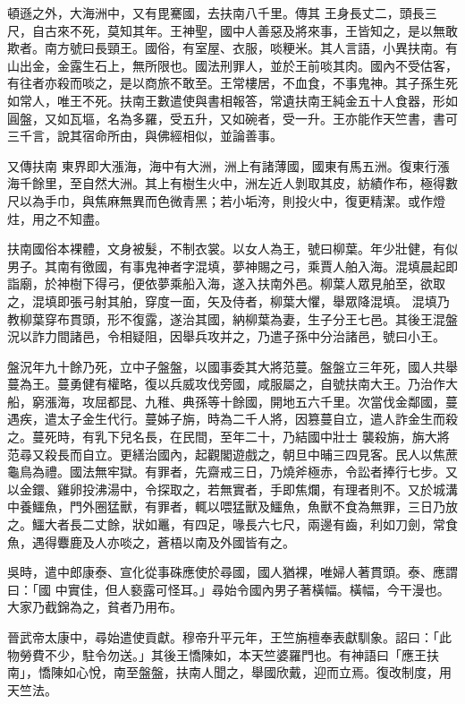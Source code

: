 \begin{pinyinscope}
 頓遜之外，大海洲中，又有毘騫國，去扶南八千里。傳其
 王身長丈二，頭長三尺，自古來不死，莫知其年。王神聖，國中人善惡及將來事，王皆知之，是以無敢欺者。南方號曰長頸王。國俗，有室屋、衣服，啖粳米。其人言語，小異扶南。有山出金，金露生石上，無所限也。國法刑罪人，並於王前啖其肉。國內不受估客，有往者亦殺而啖之，是以商旅不敢至。王常樓居，不血食，不事鬼神。其子孫生死如常人，唯王不死。扶南王數遣使與書相報答，常遺扶南王純金五十人食器，形如圓盤，又如瓦塸，名為多羅，受五升，又如碗者，受一升。王亦能作天竺書，書可三千言，說其宿命所由，與佛經相似，並論善事。



 又傳扶南
 東界即大漲海，海中有大洲，洲上有諸薄國，國東有馬五洲。復東行漲海千餘里，至自然大洲。其上有樹生火中，洲左近人剝取其皮，紡績作布，極得數尺以為手巾，與焦麻無異而色微青黑；若小垢洿，則投火中，復更精潔。或作燈炷，用之不知盡。



 扶南國俗本裸體，文身被髮，不制衣裳。以女人為王，號曰柳葉。年少壯健，有似男子。其南有徼國，有事鬼神者字混填，夢神賜之弓，乘賈人舶入海。混填晨起即詣廟，於神樹下得弓，便依夢乘船入海，遂入扶南外邑。柳葉人眾見舶至，欲取之，混填即張弓射其舶，穿度一面，矢及侍者，柳葉大懼，舉眾降混填。
 混填乃教柳葉穿布貫頭，形不復露，遂治其國，納柳葉為妻，生子分王七邑。其後王混盤況以詐力間諸邑，令相疑阻，因舉兵攻并之，乃遣子孫中分治諸邑，號曰小王。



 盤況年九十餘乃死，立中子盤盤，以國事委其大將范蔓。盤盤立三年死，國人共舉蔓為王。蔓勇健有權略，復以兵威攻伐旁國，咸服屬之，自號扶南大王。乃治作大船，窮漲海，攻屈都昆、九稚、典孫等十餘國，開地五六千里。次當伐金鄰國，蔓遇疾，遣太子金生代行。蔓姊子旃，時為二千人將，因篡蔓自立，遣人詐金生而殺之。蔓死時，有乳下兒名長，在民間，至年二十，乃結國中壯士
 襲殺旃，旃大將范尋又殺長而自立。更繕治國內，起觀閣遊戲之，朝旦中晡三四見客。民人以焦蔗龜鳥為禮。國法無牢獄。有罪者，先齋戒三日，乃燒斧極赤，令訟者捧行七步。又以金鐶、雞卵投沸湯中，令探取之，若無實者，手即焦爛，有理者則不。又於城溝中養鱷魚，門外圈猛獸，有罪者，輒以喂猛獸及鱷魚，魚獸不食為無罪，三日乃放之。鱷大者長二丈餘，狀如鼉，有四足，喙長六七尺，兩邊有齒，利如刀劍，常食魚，遇得麞鹿及人亦啖之，蒼梧以南及外國皆有之。



 吳時，遣中郎康泰、宣化從事硃應使於尋國，國人猶裸，唯婦人著貫頭。泰、應謂曰：「國
 中實佳，但人褻露可怪耳。」尋始令國內男子著橫幅。橫幅，今干漫也。大家乃截錦為之，貧者乃用布。



 晉武帝太康中，尋始遣使貢獻。穆帝升平元年，王竺旃檀奉表獻馴象。詔曰：「此物勞費不少，駐令勿送。」其後王憍陳如，本天竺婆羅門也。有神語曰「應王扶南」，憍陳如心悅，南至盤盤，扶南人聞之，舉國欣戴，迎而立焉。復改制度，用天竺法。




\end{pinyinscope}

